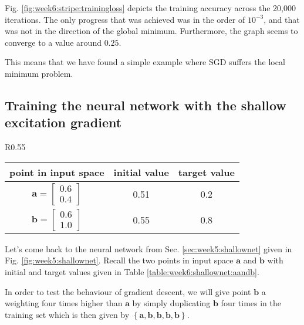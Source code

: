 \documentclass{article}
\renewcommand\vec{\mathbf}
\begin{document}
Fig. \ref{fig:week6:stripe:trainingloss} depicts the training accuracy across the 20,000 iterations.
The only progress that was achieved was in the order of $10^{-3}$, and that was not in the direction of the global minimum.
Furthermore, the graph seems to converge to a value around $0.25$.

This means that we have found a simple example where SGD suffers the local minimum problem.

\clearpage
\subsection{Training the neural network with the shallow excitation gradient}

\begin{wraptable}{R}{0.55\textwidth}
    \begin{tabular}{c|c|c}
        point in input space & initial value & target value \\
        \hline
        $\vec{a} = \begin{bmatrix}
            0.6 \\ 0.4
        \end{bmatrix}$
        &  0.51 & 0.2 \\
        $\vec{b} = \begin{bmatrix}
            0.6 \\ 1.0
        \end{bmatrix}$
        &  0.55 & 0.8
    \end{tabular}
    \caption{Initial and target values for $\vec{a}$ and $\vec{b}$.}
    \label{table:week6:shallownet:aandb}
\end{wraptable}
Let's come back to the neural network from Sec. \ref{sec:week5:shallownet} given in Fig. \ref{fig:week5:shallownet}.
Recall the two points in input space $\vec{a}$ and $\vec{b}$ with initial and target values given in Table \ref{table:week6:shallownet:aandb}.

In order to test the behaviour of gradient descent, we will give point $\vec{b}$ a weighting four times higher than $\vec{a}$ by simply duplicating $\vec{b}$ four times in the training set which is then given by $\left\{ \vec{a}, \vec{b}, \vec{b}, \vec{b}, \vec{b}\right\}$.
\end{document}
